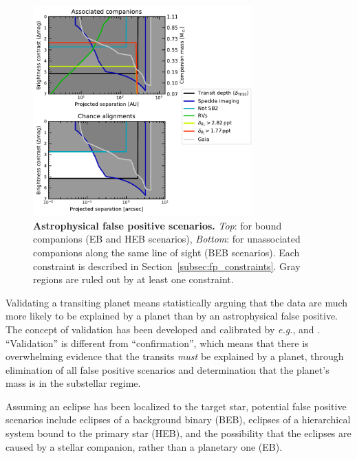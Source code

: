 \documentclass[12pt,twocolumn,tighten]{aastex63}
\begin{document}
\begin{figure}[!t]
	\begin{center}
		\leavevmode
		\includegraphics[width=0.75\textwidth]{f6.pdf}
	\end{center}
	\vspace{-0.7cm}
	\caption{
    {\bf Astrophysical false positive scenarios.} {\it Top}: for bound
    companions (EB and HEB scenarios), {\it Bottom}: for unassociated
    companions along the same line of sight (BEB scenarios).  Each
    constraint is described in Section~\ref{subsec:fp_constraints}.
    Gray regions are ruled out by at least one constraint.
		\label{fig:fpscenario}
	}
\end{figure}

Validating a transiting planet means statistically arguing that the
data are much more likely to be explained by a planet than by an
astrophysical false positive. The concept of validation has been
developed and calibrated by {\it e.g.},
\citet{torres_modeling_2011,morton_efficient_2012,diaz_pastis_2014,santerne_pastis_2015,morton_false_2016}
and \citet{giacalone_triceratops_2020}.  ``Validation'' is different
from ``confirmation'', which means that there is overwhelming evidence
that the transits {\it must} be explained by a planet, through
elimination of all false positive scenarios and determination that the
planet's mass is in the substellar regime.

Assuming an eclipse has been localized to the target star, potential
false positive scenarios include eclipses of a background binary
(BEB), eclipses of a hierarchical system bound to the primary star
(HEB), and the possibility that the eclipses are caused by a
stellar companion, rather than a planetary one (EB).
\end{document}
